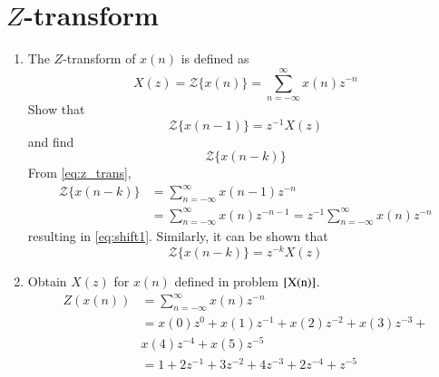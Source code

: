 \documentclass[journal,12pt,twocolumn]{IEEEtran}
\renewcommand\thesection{\arabic{section}}
\begin{document}
\section{$Z$-transform}
\begin{enumerate}[label=\thesection.\arabic*]
\item The $Z$-transform of $x(n)$ is defined as
%
\begin{equation}
\label{eq:z_trans}
X(z)={\mathcal {Z}}\{x(n)\}=\sum _{n=-\infty }^{\infty }x(n)z^{-n}
\end{equation}
%
Show that
\begin{equation}
\label{eq:shift1}
{\mathcal {Z}}\{x(n-1)\} = z^{-1}X(z)
\end{equation}
and find
\begin{equation}
	{\mathcal {Z}}\{x(n-k)\} 
\end{equation}
\solution From \eqref{eq:z_trans},
\begin{align}
{\mathcal {Z}}\{x(n-k)\} &=\sum _{n=-\infty }^{\infty }x(n-1)z^{-n}
\\
&=\sum _{n=-\infty }^{\infty }x(n)z^{-n-1} = z^{-1}\sum _{n=-\infty }^{\infty }x(n)z^{-n}
\end{align}
resulting in \eqref{eq:shift1}. Similarly, it can be shown that
%
\begin{equation}
\label{eq:z_trans_shift}
	{\mathcal {Z}}\{x(n-k)\} = z^{-k}X(z)
\end{equation}

\item Obtain $X(z)$ for $x(n)$ defined in problem  $\eqref{X(n)}$.
\solution
\begin{align}
Z(x(n))&=\sum_{n=-\infty}^{\infty}x(n)z^{-n}\\
&=x(0)z^{0}+x(1)z^{-1}+x(2)z^{-2}+x(3)z^{-3}+\\
&\nonumber x(4)z^{-4}+x(5)z^{-5}\\
&=1+2z^{-1}+3z^{-2}+4z^{-3}+2z^{-4}+z^{-5}
\end{align}


\end{enumerate}
\end{document}
